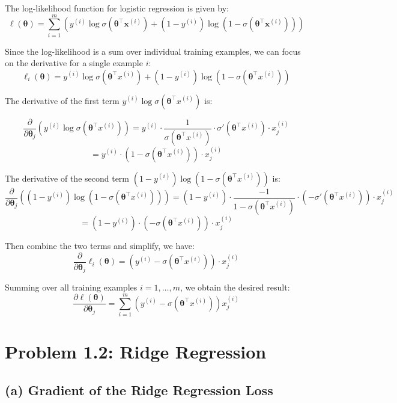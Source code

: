 \documentclass[12pt]{article}
\begin{document}
The log-likelihood function for logistic regression is given by:
\[
    \ell(\boldsymbol{\theta}) = \sum_{i=1}^{m} \left( y^{(i)} \log \sigma(\boldsymbol{\theta}^\top \boldsymbol{x}^{(i)}) + (1 - y^{(i)}) \log(1 - \sigma(\boldsymbol{\theta}^\top \boldsymbol{x}^{(i)})) \right)
\]

Since the log-likelihood is a sum over individual training examples, we can focus on the derivative for a single example \(i\):
\[
    \ell_i(\boldsymbol\theta) = y^{(i)} \log \sigma(\boldsymbol\theta^\top x^{(i)}) + (1 - y^{(i)}) \log(1 - \sigma(\boldsymbol\theta^\top x^{(i)}))
\]

The derivative of the first term \(y^{(i)} \log \sigma(\boldsymbol\theta^\top x^{(i)})\) is:


\[
    \frac{\partial}{\partial \boldsymbol\theta_j} \left( y^{(i)} \log \sigma(\boldsymbol\theta^\top x^{(i)}) \right)
    = y^{(i)} \cdot \frac{1}{\sigma(\boldsymbol\theta^\top x^{(i)})} \cdot \sigma'(\boldsymbol\theta^\top x^{(i)}) \cdot x_j^{(i)}
\]
\[
    = y^{(i)} \cdot (1 - \sigma(\boldsymbol\theta^\top x^{(i)})) \cdot x_j^{(i)}
\]

The derivative of the second term \((1 - y^{(i)}) \log(1 - \sigma(\boldsymbol\theta^\top x^{(i)}))\) is:
\[
    \frac{\partial}{\partial \boldsymbol\theta_j} \left( (1 - y^{(i)}) \log(1 - \sigma(\boldsymbol\theta^\top x^{(i)})) \right)
    = (1 - y^{(i)}) \cdot \frac{-1}{1 - \sigma(\boldsymbol\theta^\top x^{(i)})} \cdot (-\sigma'(\boldsymbol\theta^\top x^{(i)})) \cdot x_j^{(i)}
\]
\[
    = (1 - y^{(i)}) \cdot (- \sigma(\boldsymbol\theta^\top x^{(i)})) \cdot x_j^{(i)}
\]

Then combine the two terms and simplify, we have:
\[
    \frac{\partial}{\partial \boldsymbol\theta_j}\ell_i(\boldsymbol\theta) = (y^{(i)} - \sigma(\boldsymbol\theta^\top x^{(i)})) \cdot x_j^{(i)}
\]

Summing over all training examples \(i = 1, \ldots, m\), we obtain the desired result:
\[
    \frac{\partial \ell(\boldsymbol\theta)}{\partial \boldsymbol\theta_j} = \sum_{i=1}^{m} \left( y^{(i)} - \sigma(\boldsymbol\theta^\top x^{(i)}) \right) x_j^{(i)}
\]

\section*{Problem 1.2: Ridge Regression}

\subsection*{(a) Gradient of the Ridge Regression Loss}
\end{document}
